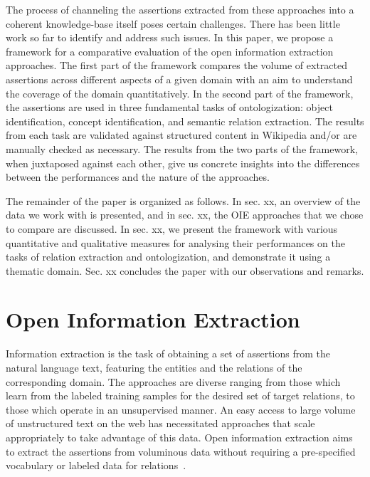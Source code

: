 \documentclass{llncs}
\begin{document}
The process of channeling the assertions extracted from these approaches into a coherent knowledge-base itself poses certain challenges. There has been little work so far to identify and address such issues. In this paper, we propose a framework for a comparative evaluation of the open information extraction approaches. The first part of the framework compares the volume of extracted assertions across different aspects of a given domain with an aim to understand the coverage of the domain quantitatively. In the second part of the framework, the assertions are used in three fundamental tasks of ontologization: object identification, concept identification, and semantic relation extraction. The results from each task are validated against structured content in Wikipedia and/or are manually checked as necessary. The results from the two parts of the framework, when juxtaposed against each other, give us concrete insights into the differences between the performances and the nature of the approaches.

The remainder of the paper is organized as follows. In sec. xx,  an overview of the data we work with is presented, and in sec. xx, the OIE approaches that we chose to compare are discussed. In sec. xx, we present the framework with various quantitative and qualitative measures for analysing their performances on the tasks of relation extraction and ontologization, and demonstrate it using a thematic domain. Sec. xx concludes the paper with our observations and remarks.

\section{Open Information Extraction}
\label{sec:oie}
Information extraction is the task of obtaining a set of assertions from the natural language text, featuring the entities and the relations of the corresponding domain. The approaches are diverse ranging from those which learn from the labeled training samples for the desired set of target relations, to those which operate in an unsupervised manner. An easy access to large volume of unstructured text on the web has necessitated approaches that scale appropriately to take advantage of this data. Open information extraction aims to extract the assertions from voluminous data without requiring a pre-specified vocabulary or labeled data for relations~\cite{Etzioni2008a}.
\end{document}
